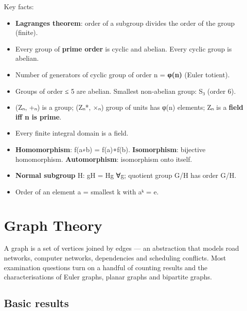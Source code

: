 



Key facts:

\begin{itemize}
\tightlist
\item
  \textbf{Lagrange\textquotesingle s theorem}: order of a subgroup divides the order of the group (finite).
\item
  Every group of \textbf{prime order} is cyclic and abelian. Every cyclic group is abelian.
\item
  Number of generators of cyclic group of order n = \textbf{φ(n)} (Euler totient).
\item
  Groups of order ≤ 5 are abelian. Smallest non-abelian group: S₃ (order 6).
\item
  (Zₙ, +ₙ) is a group; (Zₙ*, ×ₙ) group of units has φ(n) elements; Zₙ is a \textbf{field iff n is prime}.
\item
  Every finite integral domain is a field.
\item
  \textbf{Homomorphism}: f(a∗b) = f(a)∘f(b). \textbf{Isomorphism}: bijective homomorphism. \textbf{Automorphism}: isomorphism onto itself.
\item
  \textbf{Normal subgroup} H: gH = Hg ∀g; quotient group G/H has order \textbar G\textbar/\textbar H\textbar.
\item
  Order of an element a = smallest k with aᵏ = e.
\end{itemize}

\needspace{161pt}

\hypertarget{p2-01--5-graph-theory}{%
\section{Graph Theory}\label{p2-01--5-graph-theory}}

A graph is a set of vertices joined by edges --- an abstraction that models road networks, computer networks,
dependencies and scheduling conflicts. Most examination questions turn on a handful of counting results and
the characterisations of Euler graphs, planar graphs and bipartite graphs.

\needspace{95pt}

\hypertarget{p2-01--51-basic-results}{%
\subsection{Basic results}\label{p2-01--51-basic-results}}

